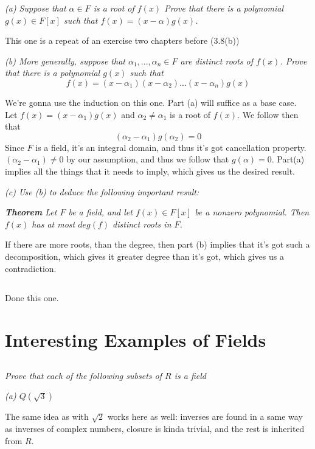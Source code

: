 \documentclass[11pt,oneside,titlepage]{book}
\begin{document}
\textit{(a) Suppose that $\alpha \in F$ is a root of $f(x)$ Prove that
there is a polynomial $g(x) \in F[x]$ such that $f(x) = (x - \alpha)
g(x)$.}

This one is a repeat of an exercise two chapters before (3.8(b))

\textit{(b) More generally, suppose that $\alpha_1, ..., \alpha_n \in
F$ are distinct roots of $f(x)$. Prove that there is a polynomial
$g(x)$ such that
  $$f(x) = (x - \alpha_1) (x - \alpha_2) ... (x - \alpha_n) g(x)$$
}

We're gonna use the induction on this one. Part (a) will suffice as a
base case. Let $f(x) = (x - \alpha_1) g(x)$ and $\alpha_2 \neq
\alpha_1$ is a root of $f(x)$. We follow then that
$$(\alpha_2 - \alpha_1) g(\alpha_2) = 0$$
Since $F$ is a field, it's an integral domain, and thus it's got
cancellation property.  $(\alpha_2 - \alpha_1) \neq 0$ by our
assumption, and thus we follow that $g(\alpha) = 0$.  Part(a) implies
all the things that it needs to imply, which gives us the desired
result.

\textit{(c) Use (b) to deduce the following important result:}

\textit{\textbf{Theorem} Let $F$ be a field, and let $f(x) \in F[x]$
be a nonzero polynomial.  Then $f(x)$ has at most $deg(f)$ distinct
roots in $F$.}

If there are more roots, than the degree, then part (b) implies that
it's got such a decomposition, which gives it greater degree than it's
got, which gives us a contradiction.

\subsection{}

Done this one.

\section{Interesting Examples of Fields}

\subsection{}

\textit{Prove that each of the following subsets of $R$ is a field}

\textit{(a) $Q(\sqrt{3})$}

The same idea as with $\sqrt{2}$ works here as well: inverses are
found in a same way as inverses of complex numbers, closure is kinda
trivial, and the rest is inherited from $R$. 
\end{document}
